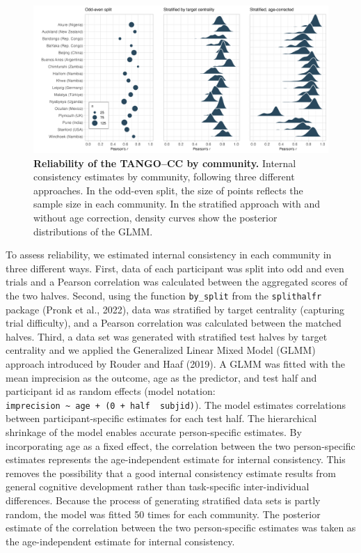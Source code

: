 \documentclass[
  man,floatsintext]{apa7}
\begin{document}
\begin{figure}

{\centering \includegraphics[width=1\linewidth]{../figures/tango-cc-reli} 

}

\caption{\textbf{Reliability of the TANGO--CC by community.} Internal consistency estimates by community, following three different approaches. In the odd-even split, the size of points reflects the sample size in each community. In the stratified approach with and without age correction, density curves show the posterior distributions of the GLMM.}\label{fig:fig4}
\end{figure}

To assess reliability, we estimated internal consistency in each community in three different ways.
First, data of each participant was split into odd and even trials and a Pearson correlation was calculated between the aggregated scores of the two halves.
Second, using the function \texttt{by\_split} from the \texttt{splithalfr} package (Pronk et al., 2022), data was stratified by target centrality (capturing trial difficulty), and a Pearson correlation was calculated between the matched halves.
Third, a data set was generated with stratified test halves by target centrality and we applied the Generalized Linear Mixed Model (GLMM) approach introduced by Rouder and Haaf (2019).
A GLMM was fitted with the mean imprecision as the outcome, age as the predictor, and test half and participant id as random effects (model notation: \texttt{imprecision\ \textasciitilde{}\ age\ +\ (0\ +\ half\ \textbar{}\ subjid)}).
The model estimates correlations between participant-specific estimates for each test half.
The hierarchical shrinkage of the model enables accurate person-specific estimates.
By incorporating age as a fixed effect, the correlation between the two person-specific estimates represents the age-independent estimate for internal consistency.
This removes the possibility that a good internal consistency estimate results from general cognitive development rather than task-specific inter-individual differences.
Because the process of generating stratified data sets is partly random, the model was fitted 50 times for each community.
The posterior estimate of the correlation between the two person-specific estimates was taken as the age-independent estimate for internal consistency.
\end{document}
